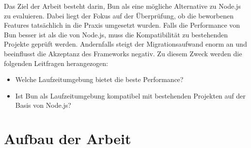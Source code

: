 \noindent
Das Ziel der Arbeit besteht darin, Bun als eine mögliche Alternative zu Node.js zu evaluieren. Dabei liegt der Fokus
auf der Überprüfung, ob die beworbenen Features tatsächlich in die Praxis umgesetzt wurden. Falls die Performance von Bun besser ist als die von Node.js, muss die Kompatibilität zu bestehenden Projekte geprüft werden. Andernfalls steigt der Migrationsaufwand enorm an und beeinflusst die Akzeptanz des Frameworks negativ. Zu diesem Zweck werden die folgenden Leitfragen herangezogen:
\begin{itemize}
    \item Welche Laufzeitumgebung bietet die beste Performance?
    \item Ist Bun als Laufzeitumgebung kompatibel mit bestehenden Projekten auf der Basis von Node.js?
\end{itemize}

\section{Aufbau der Arbeit}


